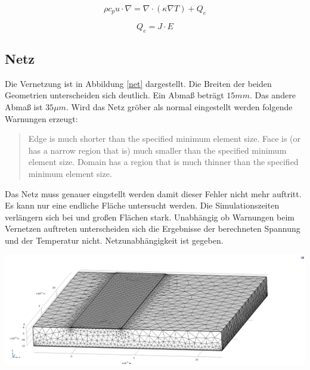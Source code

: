 \documentclass[10pt,a4paper,oneside,abstracton]{scrartcl}
\newenvironment{Figure}
  {\par\medskip\noindent\minipage{\linewidth}}
  {\endminipage\par\medskip}
\begin{document}
\begin{multicols}{2}
	\begin{equation}
		\rho c_p u \cdot \nabla = \nabla \cdot (\kappa \nabla T)+ Q_e
		\label{Super_Multi1}
		\end{equation}

		\begin{equation}
			Q_e = J \cdot E
			\label{Super_Multi2}
			\end{equation}



\subsection{Netz}
Die Vernetzung ist in Abbildung \ref*{net} dargestellt.
Die Breiten der beiden Geometrien unterscheiden sich deutlich. 
\newline
Ein Abmaß beträgt $ 15mm $. Das andere Abmaß ist $ 35 \mu m$.  
\newline
Wird das Netz gröber als normal eingestellt werden folgende Warnungen erzeugt: 
\begin{quote}
Edge is much shorter than the specified minimum element size.
\newline
Face is (or has a narrow region that is) much smaller than the specified minimum element size.
\newline
Domain has a region that is much thinner than the specified minimum element size.
\end{quote}
\noindent
Das Netz muss genauer eingstellt werden damit dieser Fehler nicht mehr auftritt. 
\newline
Es kann nur eine endliche Fläche untersucht werden.
Die Simulationszeiten verlängern sich bei und großen Flächen stark.
\newline
Unabhängig ob Warnungen beim Vernetzen auftreten unterscheiden sich die Ergebnisse der berechneten Spannung und der Temperatur nicht.
\newline
Netzunabhängigkeit ist gegeben. 

\begin{Figure}
	\includegraphics[width=\textwidth]{Bilder/net.png}
	\label{net}
\end{Figure}


\end{multicols}
\end{document}
